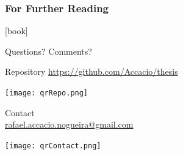 \documentclass[aspectratio=169]{beamer}
\begin{document}
\begin{frame}[allowframebreaks]
% 
% 
  \frametitle<presentation>{For Further Reading}




[book]
\printbibliography[type=book,title={Books}]
\printbibliography[type=thesis,title={Books}]

\end{frame}

\appendix

\begin{frame}[plain]
  \centering
  \vfill
  Questions? Comments?
  \vfill
  \begin{minipage}[t]{.45\linewidth}
    \small
    \centering
    Repository
    \href{https://github.com/Accacio/thesis}{https://github.com/Accacio/thesis}

    \texttt{[image: qrRepo.png]}
  \end{minipage}
  \hfill
  \begin{minipage}[t]{.5\linewidth}
    \small
    \centering
    Contact\\
    \href{mailto:rafael.accacio.nogueira@gmail.com?subject=Seminar Lyon 2023}{rafael.accacio.nogueira@gmail.com}

    \texttt{[image: qrContact.png]}
  \end{minipage}
  \fi

\end{frame}
\end{document}
